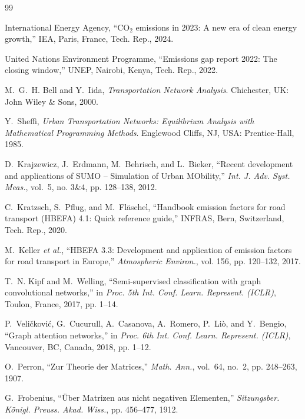 \documentclass[journal]{IEEEtran}
\begin{document}
\begin{thebibliography}{99}

International Energy Agency, ``$\text{CO}_2$ emissions in 2023: A new era of clean energy growth,'' IEA, Paris, France, Tech. Rep., 2024.

United Nations Environment Programme, ``Emissions gap report 2022: The closing window,'' UNEP, Nairobi, Kenya, Tech. Rep., 2022.

M.~G.~H. Bell and Y.~Iida, \emph{Transportation Network Analysis}. Chichester, UK: John Wiley \& Sons, 2000.

Y.~Sheffi, \emph{Urban Transportation Networks: Equilibrium Analysis with Mathematical Programming Methods}. Englewood Cliffs, NJ, USA: Prentice-Hall, 1985.

D.~Krajzewicz, J.~Erdmann, M.~Behrisch, and L.~Bieker, ``Recent development and applications of {SUMO} -- {Simulation of Urban MObility},'' \emph{Int. J. Adv. Syst. Meas.}, vol.~5, no. 3\&4, pp. 128--138, 2012.

C.~Kratzsch, S.~Pflug, and M.~Fl\"aschel, ``Handbook emission factors for road transport ({HBEFA}) 4.1: Quick reference guide,'' INFRAS, Bern, Switzerland, Tech. Rep., 2020.

M.~Keller \emph{et al.}, ``{HBEFA} 3.3: Development and application of emission factors for road transport in Europe,'' \emph{Atmospheric Environ.}, vol. 156, pp. 120--132, 2017.

T.~N. Kipf and M.~Welling, ``Semi-supervised classification with graph convolutional networks,'' in \emph{Proc. 5th Int. Conf. Learn. Represent. (ICLR)}, Toulon, France, 2017, pp. 1--14.

P.~Veli\v{c}kovi\'c, G.~Cucurull, A.~Casanova, A.~Romero, P.~Li\`o, and Y.~Bengio, ``Graph attention networks,'' in \emph{Proc. 6th Int. Conf. Learn. Represent. (ICLR)}, Vancouver, BC, Canada, 2018, pp. 1--12.

O.~Perron, ``Zur Theorie der Matrices,'' \emph{Math. Ann.}, vol.~64, no.~2, pp. 248--263, 1907.

G.~Frobenius, ``\"Uber Matrizen aus nicht negativen Elementen,'' \emph{Sitzungsber. K\"onigl. Preuss. Akad. Wiss.}, pp. 456--477, 1912.


\end{thebibliography}
\end{document}
